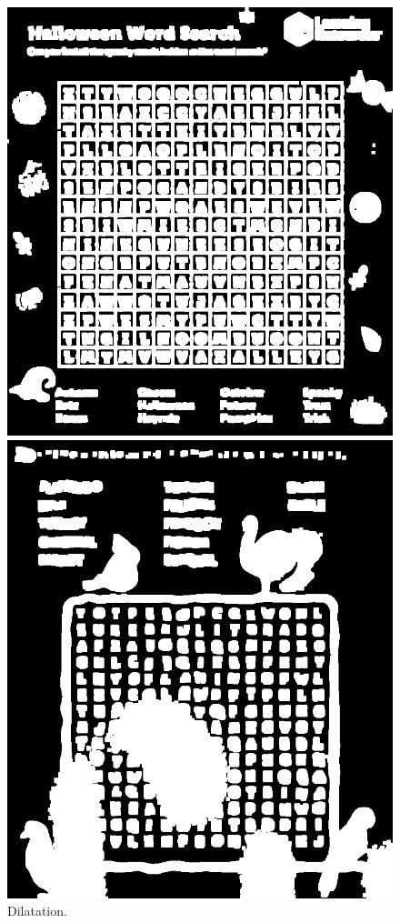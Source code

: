 \documentclass{article}
\begin{document}
\begin{figure}[H]
  \centering
      \includegraphics[width=\linewidth]{ressources/image_2_word_detection_08_dilated.png}
      \caption{}
    \endminipage\quad\quad\quad\quad
    \includegraphics[width=\linewidth]{ressources/image_3_word_detection_08_dilated.png}
    \caption{}
  \endminipage
  \caption{Dilatation.}
\end{figure}
\end{document}
